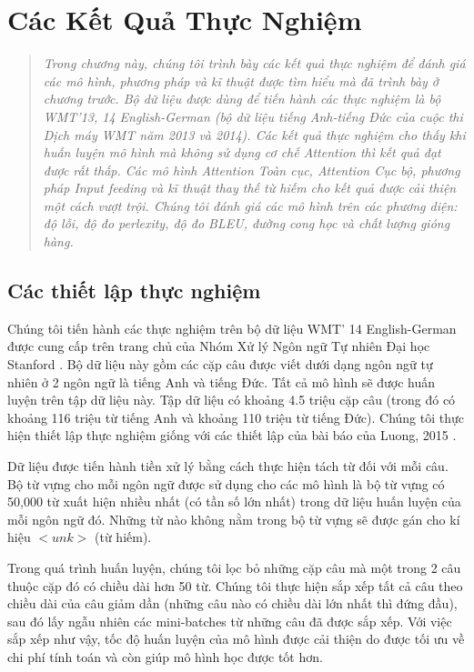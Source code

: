 \chapter{Các Kết Quả Thực Nghiệm}
\ifpdf
    \graphicspath{{Chapter4/Chapter4Figs/PNG/}{Chapter4/Chapter4Figs/PDF/}{Chapter4/Chapter4Figs/}}
\else
    \graphicspath{{Chapter4/Chapter4Figs/EPS/}{Chapter4/Chapter4Figs/}}
\fi
\label{chap_4}
\begin{quote}
\textit{Trong chương này, chúng tôi trình bày các kết quả thực nghiệm để đánh giá các mô hình, phương pháp và kĩ thuật được tìm hiểu mà đã trình bày ở chương trước. Bộ dữ liệu được dùng để tiến hành các thực nghiệm là bộ WMT'13, 14 English-German (bộ dữ liệu tiếng Anh-tiếng Đức của cuộc thi Dịch máy WMT năm 2013 và 2014). Các kết quả thực nghiệm cho thấy khi huấn luyện mô hình mà không sử dụng cơ chế Attention thì kết quả đạt được rất thấp. Các mô hình Attention Toàn cục, Attention Cục bộ, phương pháp Input feeding và kĩ thuật thay thế từ hiếm cho kết quả được cải thiện một cách vượt trội. Chúng tôi đánh giá các mô hình trên các phương diện: độ lỗi, độ đo perlexity, độ đo BLEU, đường cong học và chất lượng gióng hàng.}
\end{quote}
\section{Các thiết lập thực nghiệm}
Chúng tôi tiến hành các thực nghiệm trên bộ dữ liệu WMT' 14 English-German được cung cấp trên trang chủ của Nhóm Xử lý Ngôn ngữ Tự nhiên Đại học Stanford \cite{StanfordNMT}. Bộ dữ liệu này gồm các cặp câu được viết dưới dạng ngôn ngữ tự nhiên ở 2 ngôn ngữ là tiếng Anh và tiếng Đức. Tất cả mô hình sẽ được huấn luyện trên tập dữ liệu này. Tập dữ liệu có khoảng 4.5 triệu cặp câu (trong đó có khoảng 116 triệu từ tiếng Anh và khoảng 110 triệu từ tiếng Đức). Chúng tôi thực hiện thiết lập thực nghiệm giống với các thiết lập của bài báo của Luong, 2015 \cite{attentionThangLuong2015}.

Dữ liệu được tiến hành tiền xử lý bằng cách thực hiện tách từ đối với mỗi câu. Bộ từ vựng cho mỗi ngôn ngữ được sử dụng cho các mô hình là bộ từ vựng có 50,000 từ xuất hiện nhiều nhất (có tần số lớn nhất) trong dữ liệu huấn luyện của mỗi ngôn ngữ đó. Những từ nào không nằm trong bộ từ vựng sẽ được gán cho kí hiệu $<unk>$ (từ hiếm).

Trong quá trình huấn luyện, chúng tôi lọc bỏ những cặp câu mà một trong 2 câu thuộc cặp đó có chiều dài hơn 50 từ. Chúng tôi thực hiện sắp xếp tất cả câu theo chiều dài của câu giảm dần (những câu nào có chiều dài lớn nhất thì đứng đầu), sau đó lấy ngẫu nhiên các mini-batches từ những câu đã được sắp xếp. Với việc sắp xếp như vậy, tốc độ huấn luyện của mô hình được cải thiện do được tối ưu về chi phí tính toán và còn giúp mô hình học được tốt hơn.

